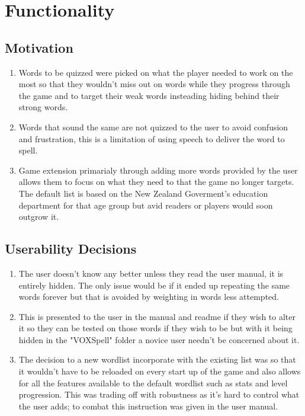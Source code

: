 \documentclass[conference]{IEEEtran}
\begin{document}
\section{Functionality}
	\subsection{Motivation}
	\begin{enumerate}
		\item Words to be quizzed were picked on what the player needed to work on the most so that they wouldn't miss out on words while they progress through the game and to target their weak words insteading hiding behind their strong words.
		\item Words that sound the same are not quizzed to the user to avoid confusion and frustration, this is a limitation of using speech to deliver the word to spell.
		\item Game extension primarialy through adding more words provided by the user allows them to focus on what they need to that the game no longer targets. The default list is based on the New Zealand Goverment's education department for that age group but avid readers or players would soon outgrow it.
	\end{enumerate}
	\subsection{Userability Decisions}
		\begin{enumerate}
			\item The user doesn't know any better unless they read the user manual, it is entirely hidden. The only issue would be if it ended up repeating the same words forever but that is avoided by weighting in words less attempted.
			\item This is presented to the user in the manual and readme if they wish to alter it so they can be tested on those words if they wish to be but with it being hidden in the "VOXSpell" folder a novice user needn't be concerned about it.
			\item The decision to a new wordlist incorporate with the existing list was so that it wouldn't have to be reloaded on every start up of the game and also allows for all the features available to the default wordlist such as stats and level progression. This was trading off with robustness as it's hard to control what the user adds; to combat this instruction was given in the user manual.
		\end{enumerate}
	
\end{document}

